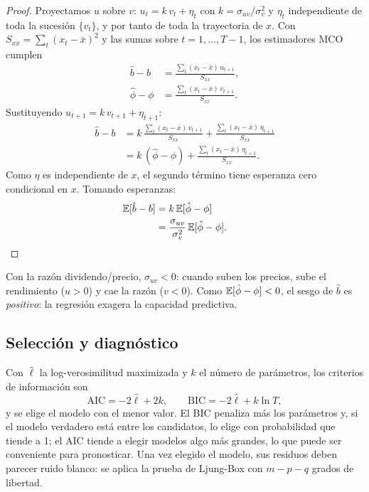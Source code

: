 \begin{proof}
Proyectamos $u$ sobre $v$: $u_t=k\,v_t+\eta_t$ con $k=\sigma_{uv}/\sigma_v^2$ y $\eta_t$ independiente de toda
la sucesión $\{v_t\}$, y por tanto de toda la trayectoria de $x$. Con $S_{xx}=\sum_t(x_t-\bar x)^2$ y las sumas
sobre $t=1,\dots,T-1$, los estimadores MCO cumplen
\begin{align*}
  \hat b-b       &= \frac{\sum_t(x_t-\bar x)\,u_{t+1}}{S_{xx}},\\
  \hat\phi-\phi  &= \frac{\sum_t(x_t-\bar x)\,v_{t+1}}{S_{xx}}.
\end{align*}
Sustituyendo $u_{t+1}=k\,v_{t+1}+\eta_{t+1}$:
\begin{align*}
  \hat b-b &= k\,\frac{\sum_t(x_t-\bar x)\,v_{t+1}}{S_{xx}}+\frac{\sum_t(x_t-\bar x)\,\eta_{t+1}}{S_{xx}}\\
           &= k\,(\hat\phi-\phi)+\frac{\sum_t(x_t-\bar x)\,\eta_{t+1}}{S_{xx}} .
\end{align*}
Como $\eta$ es independiente de $x$, el segundo término tiene esperanza cero condicional en $x$. Tomando
esperanzas:
\begin{align*}
  \mathbb{E}[\hat b-b] &= k\,\mathbb{E}[\hat\phi-\phi]\\
               &= \frac{\sigma_{uv}}{\sigma_v^2}\,\mathbb{E}[\hat\phi-\phi]. && \qedhere
\end{align*}
\end{proof}

Con la razón dividendo/precio, $\sigma_{uv}<0$: cuando suben los precios, sube el rendimiento ($u>0$) y cae la
razón ($v<0$). Como $\mathbb{E}[\hat\phi-\phi]<0$, el sesgo de $\hat b$ es \emph{positivo}: la regresión exagera la
capacidad predictiva.

\subsection{Selección y diagnóstico}

Con $\hat\ell$ la log-verosimilitud maximizada y $k$ el número de parámetros, los criterios de información son
\[
  \mathrm{AIC}=-2\hat\ell+2k,\qquad \mathrm{BIC}=-2\hat\ell+k\ln T,
\]
y se elige el modelo con el menor valor. El BIC penaliza más los parámetros y, si el modelo verdadero está entre
los candidatos, lo elige con probabilidad que tiende a 1; el AIC tiende a elegir modelos algo más grandes, lo
que puede ser conveniente para pronosticar. Una vez elegido el modelo, sus residuos deben parecer ruido blanco:
se aplica la prueba de Ljung-Box con $m-p-q$ grados de libertad.

